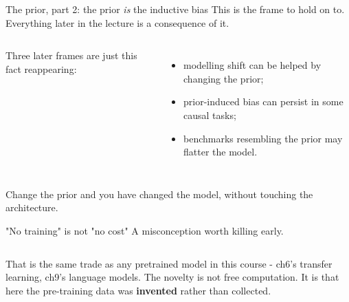 \documentclass[aspectratio=169]{beamer}
\begin{document}
\begin{frame}{The prior, part 2: the prior \emph{is} the inductive bias}
  \small
  This is the frame to hold on to. Everything later in the lecture is a consequence of it.
  \vskip 8pt
  \begin{columns}[T]
    \footnotesize
    Three later frames are just this fact reappearing:
    \vskip 4pt
    \begin{itemize}\itemsep 2pt
      \item modelling shift can be helped by changing the prior;
      \item prior-induced bias can persist in some causal tasks;
      \item benchmarks resembling the prior may flatter the model.
    \end{itemize}
  \end{columns}
  \vskip 8pt
  \centering
  \footnotesize
  Change the prior and you have changed the model, without touching the architecture.
\end{frame}

\begin{frame}{"No training" is not "no cost"}
  \small
  A misconception worth killing early.
  \vskip 8pt
  \begin{columns}[T]
  \end{columns}
  \vskip 10pt
  \centering
  \footnotesize
  That is the same trade as any pretrained model in this course - ch6's transfer learning, ch9's
  language models. The novelty is not free computation. It is that here the pre-training data
  was \textbf{invented} rather than collected.
\end{frame}
\end{document}
